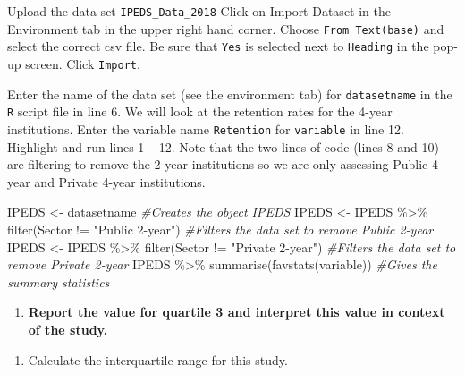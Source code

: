 \documentclass[
]{report}
\newenvironment{Shaded}{\begin{snugshade}}{\end{snugshade}}
\newcommand{\CommentTok}[1]{\textcolor[rgb]{0.56,0.35,0.01}{\textit{#1}}}
\newcommand{\FunctionTok}[1]{\textcolor[rgb]{0.00,0.00,0.00}{#1}}
\newcommand{\NormalTok}[1]{#1}
\newcommand{\OtherTok}[1]{\textcolor[rgb]{0.56,0.35,0.01}{#1}}
\newcommand{\SpecialCharTok}[1]{\textcolor[rgb]{0.00,0.00,0.00}{#1}}
\newcommand{\StringTok}[1]{\textcolor[rgb]{0.31,0.60,0.02}{#1}}
\providecommand{\tightlist}{%
  \setlength{\itemsep}{0pt}\setlength{\parskip}{0pt}}
\begin{document}
Upload the data set \texttt{IPEDS\_Data\_2018} Click on Import Dataset in the Environment tab in the upper right hand corner. Choose \texttt{From\ Text(base)} and select the correct csv file. Be sure that \texttt{Yes} is selected next to \texttt{Heading} in the pop-up screen. Click \texttt{Import}.

Enter the name of the data set (see the environment tab) for \texttt{datasetname} in the \texttt{R} script file in line 6. We will look at the retention rates for the 4-year institutions. Enter the variable name \texttt{Retention} for \texttt{variable} in line 12. Highlight and run lines 1 -- 12. Note that the two lines of code (lines 8 and 10) are filtering to remove the 2-year institutions so we are only assessing Public 4-year and Private 4-year institutions.

\begin{Shaded}
\begin{Highlighting}[]
\NormalTok{IPEDS }\OtherTok{\textless{}{-}}\NormalTok{ datasetname }\CommentTok{\#Creates the object IPEDS }
\NormalTok{IPEDS }\OtherTok{\textless{}{-}}\NormalTok{ IPEDS }\SpecialCharTok{\%\textgreater{}\%}
  \FunctionTok{filter}\NormalTok{(Sector }\SpecialCharTok{!=} \StringTok{"Public 2{-}year"}\NormalTok{) }\CommentTok{\#Filters the data set to remove Public 2{-}year}
\NormalTok{IPEDS }\OtherTok{\textless{}{-}}\NormalTok{ IPEDS }\SpecialCharTok{\%\textgreater{}\%}
  \FunctionTok{filter}\NormalTok{(Sector }\SpecialCharTok{!=} \StringTok{"Private 2{-}year"}\NormalTok{) }\CommentTok{\#Filters the data set to remove Private 2{-}year}
\NormalTok{IPEDS }\SpecialCharTok{\%\textgreater{}\%}
  \FunctionTok{summarise}\NormalTok{(}\FunctionTok{favstats}\NormalTok{(variable)) }\CommentTok{\#Gives the summary statistics}
\end{Highlighting}
\end{Shaded}

\begin{enumerate}
\def\labelenumi{\arabic{enumi}.}
\setcounter{enumi}{2}
\tightlist
\item
  \textbf{Report the value for quartile 3 and interpret this value in context of the study.}
\end{enumerate}

\vspace{1in}

\begin{enumerate}
\def\labelenumi{\arabic{enumi}.}
\setcounter{enumi}{3}
\tightlist
\item
  Calculate the interquartile range for this study.
\end{enumerate}
\end{document}
